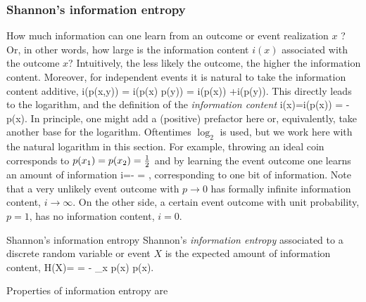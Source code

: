 \subsubsection{Shannon's information entropy}
How much information can one learn from an outcome or event realization $x$ ? Or, in other words, how large is the information content $i(x)$ associated with the outcome $x$? Intuitively, the less likely the outcome, the higher the information content. Moreover, for independent events it is natural to take the information content additive,
\be 
i(p(x,y)) = i(p(x) p(y)) = i(p(x)) +i(p(y)).
\ee 
This directly leads to the logarithm, and the definition of the \emph{information content}
\be 
i(x)=i(p(x)) = -\ln p(x).
\ee 
In principle, one might add a (positive) prefactor here or, equivalently, take another base for the logarithm. Oftentimes $\log_2$ is used, but we work here with the natural logarithm in this section. For example, throwing an ideal coin corresponds to $p(x_1)=p(x_2)=\frac{1}{2}$ and by learning the event outcome one learns an amount of information 
\be 
i=- \ln\half = ,
\ee 
corresponding to one bit of information. Note that a very unlikely event outcome with $p\rightarrow 0$ has formally infinite information content, $i\rightarrow \infty$. On the other side, a certain event outcome with unit probability, $p=1$, has no information content, $i=0$.
\begin{mybox}{Shannon's information entropy}
	Shannon's \emph{information entropy} associated to a discrete random variable or event $X$ is the expected amount of information content,
	\be
	\label{eq:infoShannon}
	H(X)= = - \sum_x p(x) \ln p(x).
	\ee 
\end{mybox}
Properties of information entropy are
